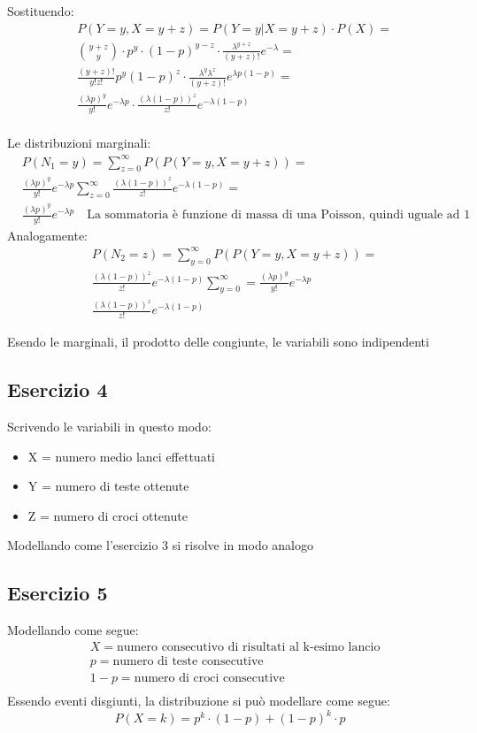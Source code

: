 \documentclass[12pt]{article}
\begin{document}
Sostituendo:
\begin{align*}
    &P(Y=y, X = y+z) = P(Y=y|X = y+z)\cdot P(X) = \\
    &\binom{y+z}{y}\cdot p^y \cdot (1-p)^{y-z} \cdot \frac{\lambda^{y+z}}{(y+z)!} e^{-\lambda} = \\
    &\frac{(y+z)!}{y!z!}p^y(1-p)^z \cdot \frac{\lambda^y \lambda^z}{(y+z)!} e^{\lambda p (1-p)} = \\
    &\frac{(\lambda p)^y}{y!}e^{-\lambda p} \cdot \frac{(\lambda (1-p))^z}{z!}e^{-\lambda (1-p)} \\        
\end{align*}

Le distribuzioni marginali:
\begin{align*}
    &P(N_1 = y) = \sum_{z=0}^{\infty} P(P(Y=y, X = y+z)) = \\
    &\frac{(\lambda p)^y}{y!}e^{-\lambda p} \sum_{z=0}^{\infty}\frac{(\lambda (1-p))^z}{z!}e^{-\lambda (1-p)} = \\
    &\frac{(\lambda p)^y}{y!}e^{-\lambda p} \quad \text{La sommatoria è funzione di massa di una Poisson, quindi uguale ad 1}
\end{align*}
Analogamente:
\begin{align*}
    &P(N_2 = z) = \sum_{y=0}^{\infty} P(P(Y=y, X = y+z)) = \\
    &\frac{(\lambda (1-p))^z}{z!}e^{-\lambda (1-p)} \sum_{y=0}^{\infty} = \frac{(\lambda p)^y}{y!}e^{-\lambda p}\\
    &\frac{(\lambda (1-p))^z}{z!}e^{-\lambda (1-p)} 
\end{align*}

Esendo le marginali, il prodotto delle congiunte, le variabili sono indipendenti
\subsection*{Esercizio 4}

Scrivendo le variabili in questo modo:
\begin{itemize}
    \item X = numero medio lanci effettuati 
    \item Y = numero di teste ottenute
    \item Z = numero di croci ottenute 
\end{itemize}

Modellando come l'esercizio 3 si risolve in modo analogo

\newpage
\subsection*{Esercizio 5}
Modellando come segue:
\begin{align*}
    &X = \text{numero consecutivo di risultati al k-esimo lancio}\\
    &p = \text{numero di teste consecutive} \\
    &1-p = \text{numero di croci consecutive} \\   
\end{align*}
Essendo eventi disgiunti, la distribuzione si può modellare come segue:
\[
P(X=k) = p^k\cdot (1-p) + (1-p)^k \cdot p    
\]
\end{document}
